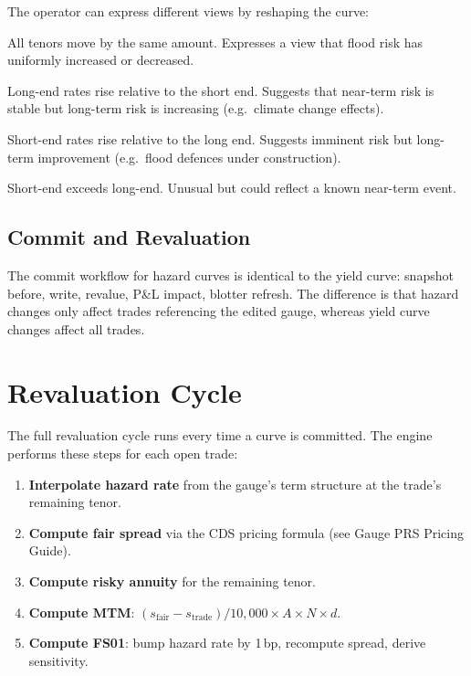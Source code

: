 \documentclass[11pt,a4paper]{article}
\begin{document}
The operator can express different views by reshaping the curve:
\begin{description}[leftmargin=2em]
  \item[Parallel shift] All tenors move by the same amount.
        Expresses a view that flood risk has uniformly increased
        or decreased.
  \item[Steepening] Long-end rates rise relative to the short end.
        Suggests that near-term risk is stable but long-term risk
        is increasing (e.g.\ climate change effects).
  \item[Flattening] Short-end rates rise relative to the long end.
        Suggests imminent risk but long-term improvement (e.g.\
        flood defences under construction).
  \item[Inversion] Short-end exceeds long-end.  Unusual but could
        reflect a known near-term event.
\end{description}

\subsection{Commit and Revaluation}

The commit workflow for hazard curves is identical to the yield curve:
snapshot before, write, revalue, P\&L impact, blotter refresh.  The
difference is that hazard changes only affect trades referencing the
edited gauge, whereas yield curve changes affect all trades.


\section{Revaluation Cycle}

The full revaluation cycle runs every time a curve is committed.  The
engine performs these steps for each open trade:

\begin{enumerate}
  \item \textbf{Interpolate hazard rate} from the gauge's term
        structure at the trade's remaining tenor.
  \item \textbf{Compute fair spread} via the CDS pricing formula
        (see Gauge PRS Pricing Guide).
  \item \textbf{Compute risky annuity} for the remaining tenor.
  \item \textbf{Compute MTM}: $(s_{\text{fair}} - s_{\text{trade}})
        / 10{,}000 \times A \times N \times d$.
  \item \textbf{Compute FS01}: bump hazard rate by 1\,bp, recompute
        spread, derive sensitivity.
\end{enumerate}
\end{document}
